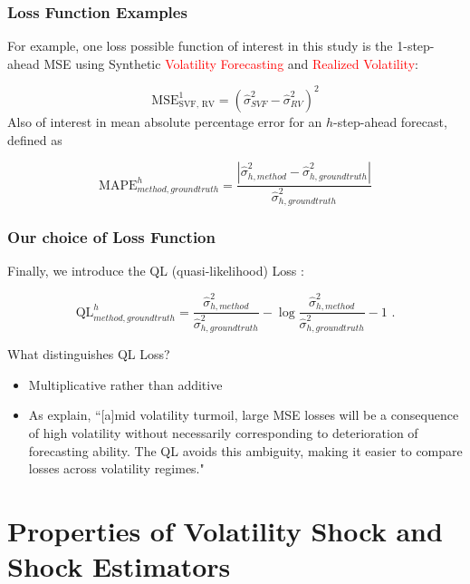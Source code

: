 \documentclass[9pt]{beamer}
\theoremstyle{definition}
\begin{document}
\begin{frame}
    \frametitle{Loss Function Examples}
For example, one loss possible function of interest in this study is the 1-step-ahead MSE using Synthetic \textcolor{red}{Volatility Forecasting} and \textcolor{red}{Realized Volatility}:

$$\text{MSE}^{1}_{\text{SVF, RV}} = (\hat\sigma^{2}_{SVF} - \hat\sigma^{2}_{RV})^{2}$$
Also of interest in mean absolute percentage error for an $h$-step-ahead forecast, defined as

$$\text{MAPE}^{h}_{method, ground truth} = \frac{|\hat\sigma^{2}_{h, method} - \hat\sigma^{2}_{h, ground truth}|}{\hat\sigma^{2}_{h, ground truth}}$$

\end{frame}

\begin{frame}\frametitle{Our choice of Loss Function}

    Finally, we introduce the QL (quasi-likelihood) Loss \parencite[][]{brownlees2011practical}:

    $$\text{QL}^{h}_{method, ground truth} = \frac{ \hat\sigma^{2}_{h, method} }{\hat\sigma^{2}_{h, ground truth}} - \log{\frac{ \hat\sigma^{2}_{h, method} }{\hat\sigma^{2}_{h, ground truth}}} -1 \text{ .}$$
    
What distinguishes QL Loss? \\

\begin{itemize}

\item Multiplicative rather than additive  

\item As \cite[][]{brownlees2011practical} explain, ``[a]mid volatility turmoil, large MSE
losses will be a consequence of high volatility without necessarily corresponding to deterioration of forecasting ability. The QL avoids this ambiguity, making it easier to compare losses across volatility regimes."

\end{itemize}

\end{frame}

\section{Properties of Volatility Shock and Shock Estimators}\label{SVF_properties}
\end{document}
